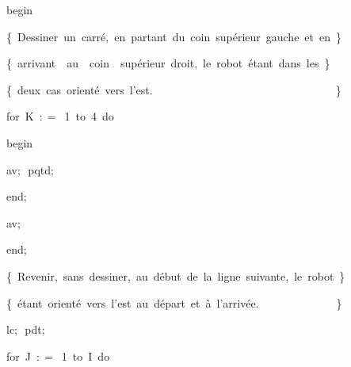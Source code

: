 {\vspace{\neglskip}\mbox{\blc  \blk\blk\blk\blk\idt  \mcl begin\idt }\par 
\vspace{\neglskip}\mbox{\blc  \blk\blk\blk\blk\blk\idt  \cmt  \{\ Dessiner\ un\ carré,\ en\ partant\ du\ coin\ supérieur\ gauche\ et\ en\ \}\idt }\par 
\vspace{\neglskip}\mbox{\blc  \blk\blk\blk\blk\blk\idt  \cmt  \{\ arrivant\ \ au\ \ coin\ \ supérieur\ droit,\ le\ robot\ étant\ dans\ les\ \}\idt }\par 
\vspace{\neglskip}\mbox{\blc  \blk\blk\blk\blk\blk\idt  \cmt  \{\ deux\ cas\ orienté\ vers\ l{'}est.\ \ \ \ \ \ \ \ \ \ \ \ \ \ \ \ \ \ \ \ \ \ \ \ \ \ \ \ \ \ \ \ \ \}\idt }\par 
\pagebreak[3] 
\vspace{\neglskip}\mbox{\blc  \blk\blk\blk\blk\blk\idt  \mcl for\idt \ K\ $:$$=$\ 1\ \mcl to\idt \ 4\ \mcl do\idt }\par 
\vspace{\neglskip}\mbox{\blc  \blk\blk\blk\blk\blk\blk\idt  \mcl begin\idt }\par 
\vspace{\neglskip}\mbox{\blc  \blk\blk\blk\blk\blk\blk\blk\idt  av$;$\ pqtd$;$\ }\par 
\vspace{\neglskip}\mbox{\blc  \blk\blk\blk\blk\blk\blk\idt  \mcl end\idt $;$}\par 
\vspace{\neglskip}\mbox{\blc  \blk\blk\blk\blk\blk\idt  av$;$}\par 
\vspace{\neglskip}\mbox{\blc  \blk\blk\blk\blk\idt  \mcl end\idt $;$}\par 
\vspace{\neglskip}\mbox{\blc  \blk\blk\blk\idt  \cmt  \{\ Revenir,\ sans\ dessiner,\ au\ début\ de\ la\ ligne\ suivante,\ le\ robot\ \}\idt }\par 
\vspace{\neglskip}\mbox{\blc  \blk\blk\blk\idt  \cmt  \{\ étant\ orienté\ vers\ l{'}est\ au\ départ\ et\ à\ l{'}arrivée.\ \ \ \ \ \ \ \ \ \ \ \ \ \ \}\idt }\par 
\vspace{\neglskip}\mbox{\blc  \blk\blk\blk\idt  lc$;$\ pdt$;$\ }\par 
\pagebreak[3] 
\vspace{\neglskip}\mbox{\blc  \blk\blk\blk\idt  \mcl for\idt \ J\ $:$$=$\ 1\ \mcl to\idt \ I\ \mcl do\idt }\par 
}
